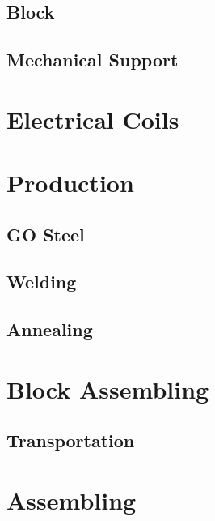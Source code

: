 \documentclass{article}
\begin{document}
\subsection{Block}

\subsection{Mechanical Support}

\section{Electrical Coils}

\section{Production}

\subsection{GO Steel}

\subsection{Welding}

\subsection{Annealing}

\section{Block Assembling}

\subsection{Transportation}

\section{Assembling}







\end{document}
